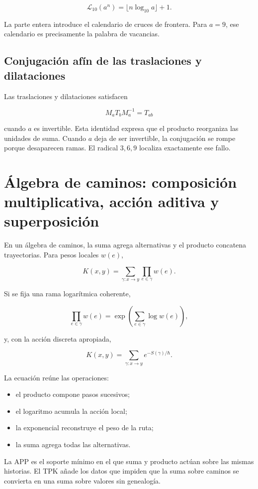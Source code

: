 \[
\mathcal L_{10}(a^n)
=\lfloor n\log_{10}a\rfloor+1.
\]

La parte entera introduce el calendario de cruces de frontera. Para \(a=9\), ese calendario es precisamente la palabra de vacancias.

\subsection{Conjugación afín de las traslaciones y dilataciones}

Las traslaciones y dilataciones satisfacen

\[
M_aT_bM_a^{-1}=T_{ab}
\]

cuando \(a\) es invertible. Esta identidad expresa que el producto reorganiza las unidades de suma. Cuando \(a\) deja de ser invertible, la conjugación se rompe porque desaparecen ramas. El radical \(3,6,9\) localiza exactamente ese fallo.


\section{Álgebra de caminos: composición multiplicativa, acción aditiva y superposición}

En un álgebra de caminos, la suma agrega alternativas y el producto concatena trayectorias. Para pesos locales \(w(e)\),

\[
K(x,y)
=\sum_{\gamma:x\to y}
\prod_{e\in\gamma}w(e).
\]

Si se fija una rama logarítmica coherente,

\[
\prod_{e\in\gamma}w(e)
=\exp\!\left(\sum_{e\in\gamma}\log w(e)\right),
\]

y, con la acción discreta apropiada,

\[
K(x,y)=\sum_{\gamma:x\to y}e^{-S(\gamma)/\hbar}.
\]

La ecuación reúne las operaciones:

\begin{itemize}
\item el producto compone pasos sucesivos;
\item el logaritmo acumula la acción local;
\item la exponencial reconstruye el peso de la ruta;
\item la suma agrega todas las alternativas.
\end{itemize}

La APP es el soporte mínimo en el que suma y producto actúan sobre las mismas historias. El TPK añade los datos que impiden que la suma sobre caminos se convierta en una suma sobre valores sin genealogía.

